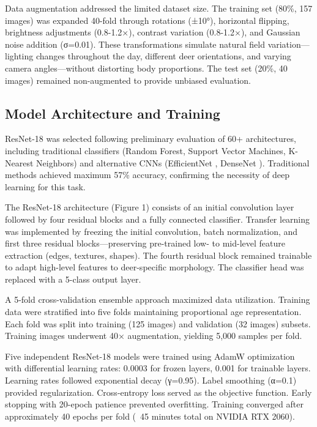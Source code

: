 \documentclass[11pt]{article}
\begin{document}
Data augmentation addressed the limited dataset size. The training set (80\%, 157 images) was expanded 40-fold through rotations (±10°), horizontal flipping, brightness adjustments (0.8-1.2×), contrast variation (0.8-1.2×), and Gaussian noise addition (σ=0.01). These transformations simulate natural field variation—lighting changes throughout the day, different deer orientations, and varying camera angles—without distorting body proportions. The test set (20\%, 40 images) remained non-augmented to provide unbiased evaluation.

\subsection{Model Architecture and Training}

ResNet-18 \cite{he2015deep} was selected following preliminary evaluation of 60+ architectures, including traditional classifiers (Random Forest, Support Vector Machines, K-Nearest Neighbors) and alternative CNNs (EfficientNet \cite{tan2019efficientnet}, DenseNet \cite{huang2017densely}). Traditional methods achieved maximum 57\% accuracy, confirming the necessity of deep learning for this task.

The ResNet-18 architecture (Figure 1) consists of an initial convolution layer followed by four residual blocks and a fully connected classifier. Transfer learning was implemented by freezing the initial convolution, batch normalization, and first three residual blocks—preserving pre-trained low- to mid-level feature extraction (edges, textures, shapes). The fourth residual block remained trainable to adapt high-level features to deer-specific morphology. The classifier head was replaced with a 5-class output layer.

A 5-fold cross-validation ensemble approach maximized data utilization. Training data were stratified into five folds maintaining proportional age representation. Each fold was split into training (125 images) and validation (32 images) subsets. Training images underwent 40× augmentation, yielding 5,000 samples per fold.

Five independent ResNet-18 models were trained using AdamW optimization with differential learning rates: 0.0003 for frozen layers, 0.001 for trainable layers. Learning rates followed exponential decay (γ=0.95). Label smoothing (α=0.1) provided regularization. Cross-entropy loss served as the objective function. Early stopping with 20-epoch patience prevented overfitting. Training converged after approximately 40 epochs per fold (~45 minutes total on NVIDIA RTX 2060).
\end{document}
